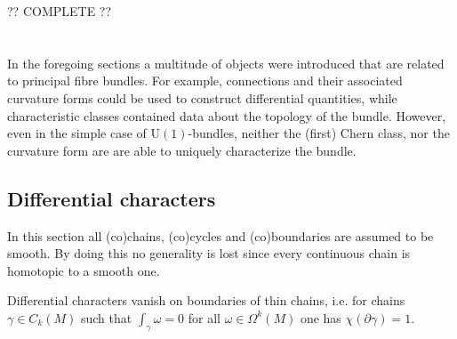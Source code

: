     ?? COMPLETE ??

\section{}\label{section:differential_cohomology}

    In the foregoing sections a multitude of objects were introduced that are related to principal fibre bundles. For example, connections and their associated curvature forms could be used to construct differential quantities, while characteristic classes contained data about the topology of the bundle. However, even in the simple case of $\mathrm{U}(1)$-bundles, neither the (first) Chern class, nor the curvature form are are able to uniquely characterize the bundle.

\subsection{Differential characters}

    In this section all (co)chains, (co)cycles and (co)boundaries are assumed to be smooth. By doing this no generality is lost since every continuous chain is homotopic to a smooth one.


    \begin{property}
        Differential characters vanish on boundaries of thin chains, i.e. for chains $\gamma\in C_k(M)$ such that $\int_\gamma\omega=0$ for all $\omega\in\Omega^k(M)$ one has $\chi(\partial\gamma)=1$.
    \end{property}

